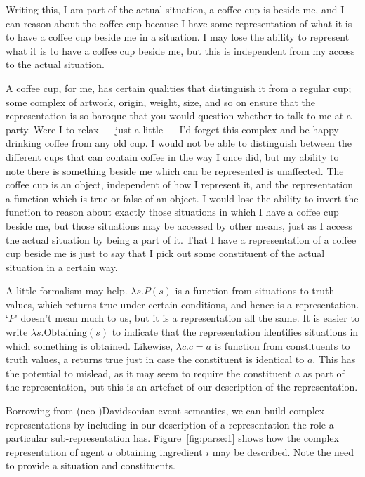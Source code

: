 \documentclass[10pt]{article}
\begin{document}
Writing this, I am part of the actual situation, a coffee cup is beside me, and I can reason about the coffee cup because I have some representation of what it is to have a coffee cup beside me in a situation.
I may lose the ability to represent what it is to have a coffee cup beside me, but this is independent from my access to the actual situation.

A coffee cup, for me, has certain qualities that distinguish it from a regular cup; some complex of artwork, origin, weight, size, and so on ensure that the representation is so baroque that you would question whether to talk to me at a party.
Were I to relax --- just a little --- I'd forget this complex and be happy drinking coffee from any old cup.
I would not be able to distinguish between the different cups that can contain coffee in the way I once did, but my ability to note there is something beside me which can be represented is unaffected.
The coffee cup is an object, independent of how I represent it, and the representation a function which is true or false of an object.
I would lose the ability to invert the function to reason about exactly those situations in which I have a coffee cup beside me, but those situations may be accessed by other means, just as I access the actual situation by being a part of it.
That I have a representation of a coffee cup beside me is just to say that I pick out some constituent of the actual situation in a certain way.

A little formalism may help.
\(\lambda s. P(s)\) is a function from situations to truth values, which returns true under certain conditions, and hence is a representation.
`\(P\)' doesn't mean much to us, but it is a representation all the same.
It is easier to write \(\lambda s. \text{Obtaining}(s)\) to indicate that the representation identifies situations in which something is obtained.
Likewise, \(\lambda c. c = a\) is function from constituents to truth values, a returns true just in case the constituent is identical to \(a\).
This has the potential to mislead, as it may seem to require the constituent \(a\) as part of the representation, but this is an artefact of our description of the representation.

Borrowing from (neo-)Davidsonian event semantics, we can build complex representations by including in our description of a representation the role a particular sub-representation has.
Figure~\ref{fig:parse:1} shows how the complex representation of agent \(a\) obtaining ingredient \(i\) may be described.
Note the need to provide a situation and constituents.
\end{document}
